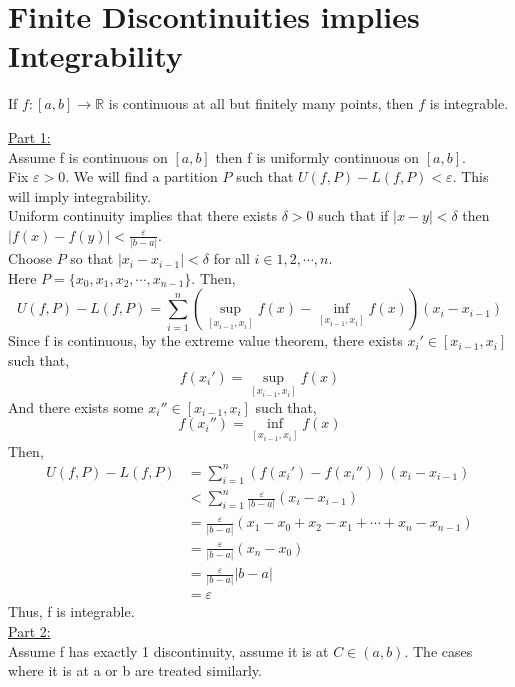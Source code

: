 \documentclass[12pt]{article}
\begin{document}
\section{Finite Discontinuities implies Integrability}
\begin{theo}{}
If \(f:[a, b]\to \mathbb R\) is continuous at all but finitely many points, then \(f\) is integrable.    
\end{theo}
\begin{prf}{}
\underline{Part 1:}\\
Assume f is continuous on \([a, b]\) then f is uniformly continuous on \([a, b]\).\\
Fix \(\varepsilon > 0\). We will find a partition \(P\) such that \(U(f, P) - L(f, P) < \varepsilon\). This will imply integrability.\\
Uniform continuity implies that there exists \(\delta > 0\) such that if \(|x - y| < \delta\) then \(|f(x) - f(y)| < \frac{\varepsilon}{|b-a|}\).\\
Choose \(P\) so that \(|x_i - x_{i-1}| < \delta \) for all \(i\in 1, 2, \cdots , n\).\\
Here \(P = \{x_0, x_1, x_2, \cdots, x_{n-1}\}\). Then, \[U(f, P) - L(f, P) = \displaystyle\sum_{i=1}^n\left(\displaystyle\sup_{[x_{i-1}, x_i]}f(x) - \displaystyle\inf_{[x_{i-1}, x_i]}f(x)\right)\left(x_i - x_{i-1}\right)\]
Since f is continuous, by the extreme value theorem, there exists \(x_i' \in [x_{i-1}, x_{i}]\) such that, \[f(x_i') = \displaystyle\sup_{[x_{i-1}, x_i]}f(x)\]
And there exists some \(x_i'' \in [x_{i-1}, x_{i}]\) such that, \[f(x_i'') = \displaystyle\inf_{[x_{i-1}, x_i]}f(x)\]
Then, 
\begin{align*}
    U(f, P) - L(f, P) &= \displaystyle\sum_{i=1}^n\left(f(x_i') - f(x_i'')\right)\left(x_i - x_{i-1}\right)\\
    &< \displaystyle\sum_{i=1}^n \frac{\varepsilon}{|b - a|} \left(x_i - x_{i-1}\right)\\
    &= \frac{\varepsilon}{|b - a|} \left(x_1 - x_0 + x_2 - x_1 + \cdots + x_n - x_{n-1}\right)\\
    &=  \frac{\varepsilon}{|b - a|}\left(x_n - x_0\right)\\
    &= \frac{\varepsilon}{|b - a|}|b - a|\\
    &= \varepsilon
\end{align*}
Thus, f is integrable.\\
\underline{Part 2:}\\
Assume f has exactly 1 discontinuity, assume it is at \(C \in (a, b)\). The cases where it is at a or b are treated similarly.\\

\end{prf}
\end{document}

